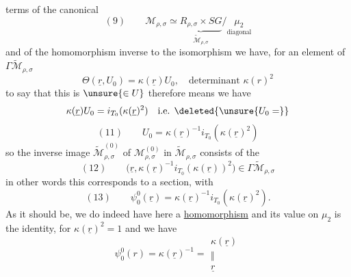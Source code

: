terms of the canonical 
\[
(9)\qquad\mathcal M_{\rho,\sigma}\simeq
\underbrace{R_{\rho,\sigma}\times SG}_{\widetilde{\mathcal M}_{\rho,\sigma}}
/\underset{\text{diagonal}}{\mu_2}
\]
and of the homomorphism
 inverse to the isomorphism
we have, for an element
of $\Gamma\widetilde{\mathcal M}_{\rho,\sigma}$
\[
\Theta(\underline r,U_0)=\kappa(\underline r)U_0,\quad
\text{determinant }\kappa(r)^2
\]
to say that this is $\unsure{\in U}$ therefore means we have
\[
\kappa(\underline r)U_0=i_{T_0}(\kappa(\underline r)^2)
\quad\text{i.e. }\deleted{\unsure{U_0=}}
\]
\[
(11)\qquad U_0=\kappa(\underline r)^{-1}i_{T_0}(\kappa(\underline r)^2)
\]
so the inverse image $\widetilde{\mathcal M}_{\rho,\sigma}^{(0)}$ of
$\mathcal M_{\rho,\sigma}^{(0)}$ in $\widetilde{\mathcal M}_{\rho,\sigma}$ consists of the
\[
(12)\qquad
\bigl(\underline r,\kappa(\underline r)^{-1}i_{T_0}(\kappa(\underline r))^2\bigr)
\in\Gamma\widetilde{\mathcal M}_{\rho,\sigma}
\]
in other words this corresponds to a  section, with
\[
(13)\qquad\psi^0_0(\underline r)=\kappa(\underline r)^{-1}i_{T_0}(\kappa(\underline r)^2).
\]
As it should be, we do indeed have here a \uline{homomorphism}
and its value on $\mu_2$ is the identity,
for $\kappa(\underline r)^2=1$ and we have
\[
\psi^0_0(r)=\kappa(\underline r)^{-1}=
\begin{gathered}\kappa(\underline r)\\\Vert\\\underline r\end{gathered}
\]

